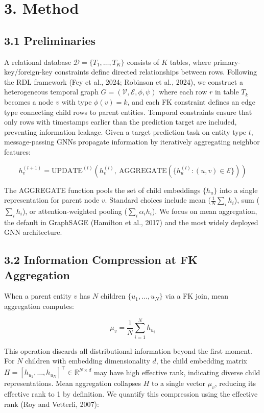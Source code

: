 \documentclass[final]{article}
\begin{document}
\section{3. Method}

\subsection{3.1 Preliminaries}

A relational database $\mathcal{D} = \{T_1, \ldots, T_K\}$ consists of $K$ tables, where primary-key/foreign-key constraints define directed relationships between rows. Following the RDL framework (Fey et al., 2024; Robinson et al., 2024), we construct a heterogeneous temporal graph $G = (\mathcal{V}, \mathcal{E}, \phi, \psi)$ where each row $r$ in table $T_k$ becomes a node $v$ with type $\phi(v) = k$, and each FK constraint defines an edge type connecting child rows to parent entities. Temporal constraints ensure that only rows with timestamps earlier than the prediction target are included, preventing information leakage. Given a target prediction task on entity type $t$, message-passing GNNs propagate information by iteratively aggregating neighbor features:

$$h_v^{(l+1)} = \text{UPDATE}^{(l)}\!\left(h_v^{(l)},\ \text{AGGREGATE}\!\left(\{h_u^{(l)} : (u,v) \in \mathcal{E}\}\right)\right)$$

The AGGREGATE function pools the set of child embeddings $\{h_u\}$ into a single representation for parent node $v$. Standard choices include mean ($\frac{1}{N}\sum_i h_i$), sum ($\sum_i h_i$), or attention-weighted pooling ($\sum_i \alpha_i h_i$). We focus on mean aggregation, the default in GraphSAGE (Hamilton et al., 2017) and the most widely deployed GNN architecture.

\subsection{3.2 Information Compression at FK Aggregation}

When a parent entity $v$ has $N$ children $\{u_1, \ldots, u_N\}$ via a FK join, mean aggregation computes:

$$\mu_v = \frac{1}{N}\sum_{i=1}^{N} h_{u_i}$$

This operation discards all distributional information beyond the first moment. For $N$ children with embedding dimensionality $d$, the child embedding matrix $H = [h_{u_1}, \ldots, h_{u_N}]^\top \in \mathbb{R}^{N \times d}$ may have high effective rank, indicating diverse child representations. Mean aggregation collapses $H$ to a single vector $\mu_v$, reducing its effective rank to 1 by definition. We quantify this compression using the effective rank (Roy and Vetterli, 2007):
\end{document}
